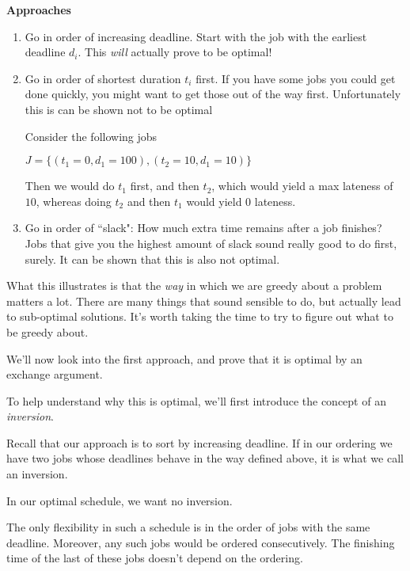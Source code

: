\documentclass[12pt]{article}
\begin{document}
  {\bf Approaches}

  \begin{enumerate}
    \item Go in order of increasing deadline. Start with the job with the
      earliest deadline $d_i$. This {\it will} actually prove to be optimal!

    \item Go in order of shortest duration $t_i$ first. If you have some jobs
      you could get done quickly, you might want to get those out of the way
      first. Unfortunately this is can be shown not to be optimal

      Consider the following jobs

      $J = \{(t_1 = 0, d_1 = 100), (t_2 = 10, d_1 = 10)\}$

      Then we would do $t_1$ first, and then $t_2$, which would yield a max
      lateness of $10$, whereas doing $t_2$ and then $t_1$ would yield $0$
      lateness.

    \item Go in order of ``slack": How much extra time remains after a job
      finishes? Jobs that give you the highest amount of slack sound really good
      to do first, surely. It can be shown that this is also not optimal.
  \end{enumerate}

  What this illustrates is that the {\it way} in which we are greedy about a
  problem matters a lot. There are many things that sound sensible to do, but
  actually lead to sub-optimal solutions. It's worth taking the time to try to
  figure out what to be greedy about.

  We'll now look into the first approach, and prove that it is optimal by an
  exchange argument.

  To help understand why this is optimal, we'll first introduce the concept of
  an {\it inversion}.


  Recall that our approach is to sort by increasing deadline. If in our
  ordering we have two jobs whose deadlines behave in the way defined above, it
  is what we call an inversion.

  In our optimal schedule, we want no inversion.

  {

    The only flexibility in such a schedule is in the order of jobs with the
    same deadline. Moreover, any such jobs would be ordered consecutively. The
    finishing time of the last of these jobs doesn't depend on the ordering.
  }
\end{document}
